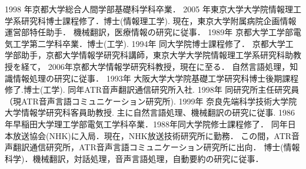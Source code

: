 \begin{biography}
{
	1998 年京都大学総合人間学部基礎科学科卒業．
	2005 年東京大学大学院情報理工学系研究科博士課程修了．博士(情報理工学).
	現在，東京大学附属病院企画情報運営部特任助手．
	機械翻訳，医療情報の研究に従事．
}
{
	1989年 京都大学工学部電気工学第二学科卒業．博士(工学).
	1994年 同大学院博士課程修了．
	京都大学工学部助手，京都大学情報学研究科講師，東京大学大学院情報理工学系研究科助教授を経て，
	2006年京都大学情報学研究科教授，現在に至る．
	自然言語処理，知識情報処理の研究に従事．
}
{
	1993年 大阪大学大学院基礎工学研究科博士後期課程修了.博士(工学).
	同年ATR音声翻訳通信研究所入社.
	1998年 同研究所主任研究員（現ATR音声言語コミュニケーション研究所).
	1999年 奈良先端科学技術大学院大学情報学研究科客員助教授.
	主に自然言語処理、機械翻訳の研究に従事.
}
{
	1986年早稲田大学理工学部電気工学科卒業．1988年同大学院修士課程修了．
	同年日本放送協会(NHK)に入局．現在，NHK放送技術研究所に勤務．
	この間，ATR音声翻訳通信研究所，ATR音声言語コミュニケーション研究所に出向．
	博士(情報科学)．機械翻訳，対話処理，音声言語処理，自動要約の研究に従事．
}



\end{biography}

